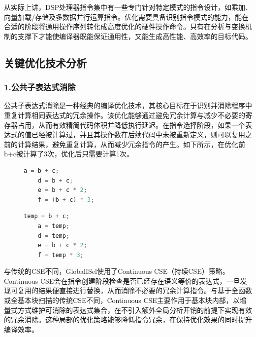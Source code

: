 从实际上讲，DSP处理器指令集中有一些专门针对特定模式的指令设计，如乘加、向量加载/存储及多数据并行运算指令。优化需要具备识别指令模式的能力，能在合适的阶段将通用操作序列转化成高度优化的硬件操作命令。只有在分析与变换机制的支撑下才能使编译器既能保证通用性，又能生成高性能、高效率的目标代码。


\subsection{关键优化技术分析}


\subsubsection{1.公共子表达式消除}
公共子表达式消除是一种经典的编译优化技术，其核心目标在于识别并消除程序中重复计算相同表达式的冗余操作。该优化能够通过避免冗余计算与减少不必要的寄存器占用，从而有效精简代码体积并降低执行延迟。在指令选择阶段，如果一个表达式的值已经被计算过，并且其操作数在后续代码中未被重新定义，则可以复用之前的计算结果，避免重复计算，从而减少冗余指令的产生。如下所示，在优化前b+c被计算了3次，优化后只需要计算1次。

\begin{figure}[htbp]
	\centering
	\begin{minipage}[t]{0.48\linewidth}
		\captionsetup{type=lstlisting}
		\begin{lstlisting}[language=C++]
	a = b + c;
	d = b + c;
	e = b + c * 2;
	f = (b + c) * 3;

		\end{lstlisting}
	\end{minipage}\hfill
	\begin{minipage}[t]{0.48\linewidth}
		\captionsetup{type=lstlisting}
		\begin{lstlisting}[language=C++]
	temp = b + c;
	a = temp;
	d = temp;
	e = b + c * 2;
	f = temp * 3;
		\end{lstlisting}
	\end{minipage}
\end{figure}

与传统的CSE不同，GlobalISel使用了Continuous CSE（持续CSE）策略。Continuous CSE会在指令创建阶段检查是否已经存在语义等价的表达式，一旦发现可复用的结果便直接进行替换，从而消除不必要的冗余计算指令。与基于全函数或全基本块扫描的传统CSE不同，Continuous CSE主要作用于基本块内部，以增量式方式维护可消除的表达式集合，在不引入额外全局分析开销的前提下实现有效的冗余消除。这种局部的优化策略能够降低指令冗余，在保持优化效果的同时提升编译效率。

